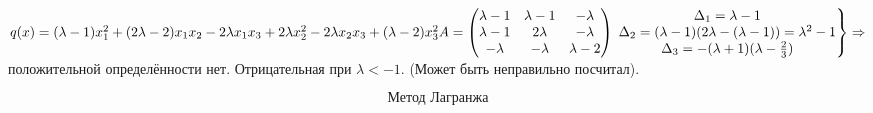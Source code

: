 \documentclass[12pt, letterpaper, twoside]{article}
\begin{document}
\begin{enumerate}
        $q(x) = (\lambda - 1)x_1^2 + (2\lambda - 2)x_1 x_2 - 2\lambda x_1 x_3 + 2\lambda x_2^2 - 2\lambda x_2 x_3 + (\lambda - 2)x_3^2\\
        A = \begin{pmatrix}
            \lambda - 1 & \lambda - 1 & -\lambda\\
            \lambda - 1 & 2\lambda & -\lambda\\
            -\lambda & -\lambda & \lambda - 2
        \end{pmatrix}\\
        \left.\begin{matrix}
            \Delta_1 = \lambda - 1\\
            \Delta_2 = (\lambda - 1)(2\lambda - (\lambda - 1)) = \lambda^2 - 1\\
            \Delta_3 = -(\lambda + 1)(\lambda - \frac{2}{3})
        \end{matrix}\right\}\Rightarrow$ положительной определённости нет. Отрицательная при $\lambda < -1$. (Может быть неправильно посчитал).
    \end{enumerate}
        \[\text{Метод Лагранжа}\]
\end{document}
